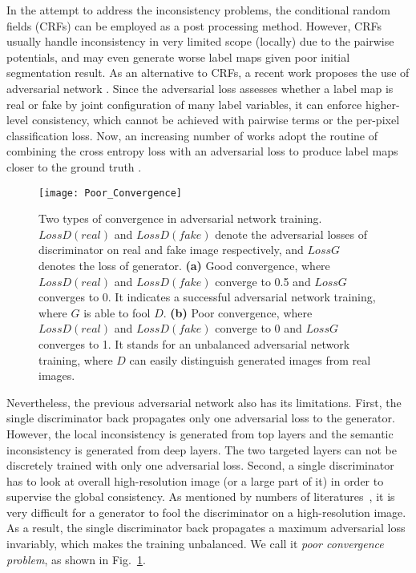 \documentclass[runningheads]{llncs}
\begin{document}
In the attempt to address the inconsistency problems, the conditional random fields (CRFs) \cite{krahenbuhl2011efficient} can be employed as a post processing method. However, CRFs usually handle inconsistency in very limited scope (locally) due to the pairwise potentials, and may even generate worse label maps given poor initial segmentation result. As an alternative to CRFs, a recent work proposes the use of adversarial network \cite{luc2016semantic}. Since the adversarial loss assesses whether a label map is real or fake by joint configuration of many label variables, it can enforce higher-level consistency, which cannot be achieved with pairwise terms or the per-pixel classification loss. Now, an increasing number of works adopt the routine of combining the cross entropy loss with an adversarial loss to produce label maps closer to the ground truth \cite{dai2017scan,moeskops2017adversarial,hung2018adversarial}.

\begin{figure}[t]
\centering
\texttt{[image: Poor\_Convergence]}

\caption{Two types of convergence in adversarial network training. $LossD(real)$ and $LossD(fake)$ denote the adversarial losses of discriminator on real and fake image respectively, and $LossG$ denotes the loss of generator. \textbf{(a)} Good convergence, where $LossD(real)$ and $LossD(fake)$ converge to 0.5 and $LossG$ converges to 0. It indicates a successful adversarial network training, where $G$ is able to fool $D$. \textbf{(b)} Poor convergence, where $LossD(real)$ and $LossD(fake)$ converge to 0 and $LossG$ converges to 1. It stands for an unbalanced adversarial network training, where $D$ can easily distinguish generated images from real images.}
\label{fig:poor}
\end{figure}

Nevertheless, the previous adversarial network also has its limitations. First, the single discriminator back propagates only one adversarial loss to the generator. However, the local inconsistency is generated from top layers and the semantic inconsistency is generated from deep layers. The two targeted layers can not be discretely trained with only one adversarial loss. Second, a single discriminator has to look at overall high-resolution image (or a large part of it) in order to supervise the global consistency. As mentioned by numbers of literatures~\cite{denton2015pyramid,karras2017progressive}, it is very difficult for a generator to fool the discriminator on a high-resolution image. As a result, the single discriminator back propagates a maximum adversarial loss invariably, which makes the training unbalanced. We call it \emph{poor convergence problem}, as shown in Fig.~\ref{fig:poor}.
\end{document}
